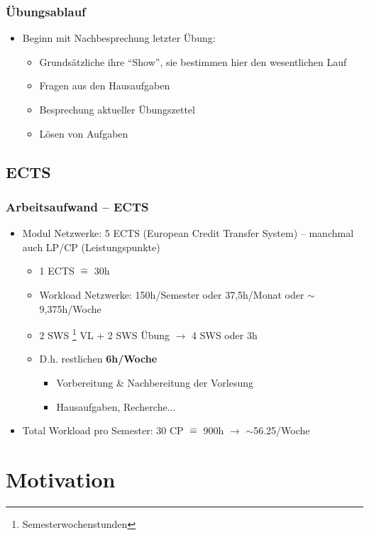 \documentclass[xcolor=dvipsnames,aspectratio=169]{beamer}
\begin{document}
\begin{frame}
	\frametitle{Übungsablauf}
	\begin{itemize}
		\item Beginn mit Nachbesprechung letzter Übung:
		\begin{itemize}
			\item Grundsätzliche ihre \enquote{Show}, sie bestimmen hier den wesentlichen Lauf
			\item Fragen aus den Hausaufgaben
			\item Besprechung aktueller Übungszettel
			\item Lösen von Aufgaben
		\end{itemize}
	\end{itemize}
\end{frame}

\subsection{ECTS}
\begin{frame}
	\frametitle{Arbeitsaufwand -- ECTS}
	\begin{itemize}
		\item Modul Netzwerke: 5 ECTS (European Credit Transfer System) -- manchmal auch LP/CP (Leistungspunkte)
			\begin{itemize}
				\item 1 ECTS $\widehat{=}$ 30h
				\item Workload Netzwerke: 150h/Semester oder 37,5h/Monat oder $\sim$ 9,375h/Woche
				\item 2 SWS \footnote{Semesterwochenstunden} VL + 2 SWS Übung $\rightarrow$ 4 SWS oder 3h
				\item D.h. restlichen \textbf{6h/Woche}
				\begin{itemize}
					\item Vorbereitung \& Nachbereitung der Vorlesung
					\item Hausaufgaben, Recherche...
				\end{itemize}
			\end{itemize}
			\item Total Workload pro Semester: 30 CP $\widehat{=}$ 900h $\rightarrow$  $\sim$56.25/Woche
	\end{itemize}
\end{frame}

\section{Motivation}
\end{document}

